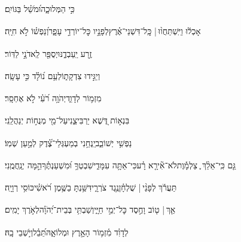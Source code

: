 \documentclass[12pt]{article}
\newcommand{\loc}[1]{\textsuperscript{\locf{#1}}}
\begin{document}
{\loc{ כט}~}‏כִּ֣י  הַמְּלוּכָ֑ה{\hfill}וּ֝מֹשֵׁ֗ל בַּגּוֹיִֽם׃\par

{\loc{ ל}~}‏אָכְל֬וּ וַיִּֽשְׁתַּחֲו֨וּ |  כׇּֽל־דִּשְׁנֵי־אֶ֗רֶץ{\hfill}לְפָנָ֣יו  כׇּל־יוֹרְדֵ֣י עָפָ֑ר\newline\hspace*{.5em}וְ֝נַפְשׁ֗וֹ לֹ֣א חִיָּֽה׃\par

{\loc{ לא}~}‏זֶ֥רַע יַֽעַבְדֶ֑נּוּ{\hfill}יְסֻפַּ֖ר לַֽאדֹנָ֣י לַדּֽוֹר׃\par

{\loc{ לב}~}‏ וְיַגִּ֣ידוּ צִדְקָת֑וֹ{\hfill}לְעַ֥ם נ֝וֹלָ֗ד כִּ֣י עָשָֽׂה׃\par\pend

\pstart[\subsection*{\textcolor{red}{פרק כג}}]\label{פרק כג}
{\loc{ א}~}‏מִזְמ֥וֹר לְדָוִ֑ד{\hfill}יְהֹוָ֥ה רֹ֝עִ֗י לֹ֣א אֶחְסָֽר׃\par

{\loc{ ב}~}‏בִּנְא֣וֹת דֶּ֭שֶׁא יַרְבִּיצֵ֑נִי{\hfill}עַל־מֵ֖י מְנֻח֣וֹת יְנַהֲלֵֽנִי׃\par

{\loc{ ג}~}‏נַפְשִׁ֥י יְשׁוֹבֵ֑ב{\hfill}יַֽנְחֵ֥נִי בְמַעְגְּלֵי־צֶ֝֗דֶק לְמַ֣עַן שְׁמֽוֹ׃\par

{\loc{ ד}~}‏גַּ֤ם כִּֽי־אֵלֵ֨ךְ ֪ צַלְמָ֡וֶת{\hfill}לֹא־אִ֘ירָ֤א רָ֗ע\newline\hspace*{.5em}כִּי־אַתָּ֥ה עִמָּדִ֑י{\hfill}שִׁבְטְךָ֥ וּ֝מִשְׁעַנְתֶּ֗ךָ\newline\hspace*{.5em}הֵ֣מָּה יְנַֽחֲמֻֽנִי׃\par

{\loc{ ה}~}‏תַּעֲרֹ֬ךְ לְפָנַ֨י |  שֻׁלְחָ֗ן{\hfill}נֶ֥גֶד צֹרְרָ֑י\newline\hspace*{.5em}דִּשַּׁ֥נְתָּ בַשֶּׁ֥מֶן רֹ֝אשִׁ֗י{\hfill}כּוֹסִ֥י רְוָיָֽה׃\par

{\loc{ ו}~}‏אַ֤ךְ |  ט֤וֹב וָחֶ֣סֶד {\hfill}כׇּל־יְמֵ֣י חַיָּ֑י\newline\hspace*{.5em}וְשַׁבְתִּ֥י בְּבֵית־יְ֝הֹוָ֗ה{\hfill}לְאֹ֣רֶךְ יָמִֽים׃\par\pend
\ledpb
\pstart[\subsection*{\textcolor{red}{פרק כד}}]\label{פרק כד}
{\loc{ א}~}‏לְדָוִ֗ד מִ֫זְמ֥וֹר\newline\hspace*{.5em} הָאָ֣רֶץ וּמְלוֹאָ֑הּ{\hfill}תֵּ֝בֵ֗ל\hspace{1em}וְיֹ֣שְׁבֵי בָֽהּ׃\par
\end{document}
